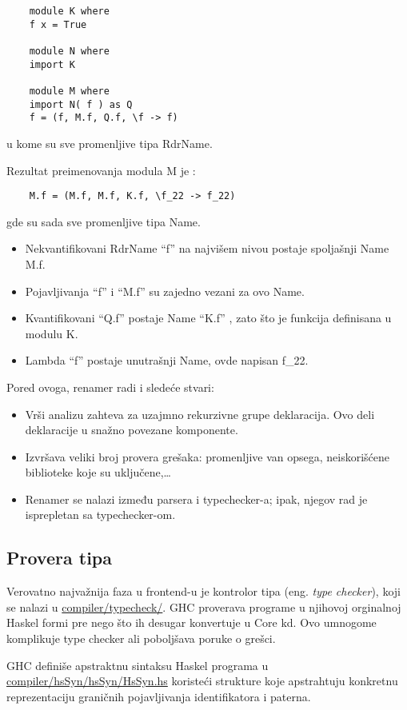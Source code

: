 \begin{verbatim}
	module K where
	f x = True
	
	module N where
	import K
	
	module M where
	import N( f ) as Q
	f = (f, M.f, Q.f, \f -> f)
\end{verbatim}
u kome su sve promenljive tipa RdrName. 

Rezultat preimenovanja modula M je :
\begin{verbatim}
	M.f = (M.f, M.f, K.f, \f_22 -> f_22)
\end{verbatim} 
gde su sada sve promenljive tipa Name.
\begin{itemize}
	\item Nekvantifikovani RdrName “f” na najvišem nivou postaje spoljašnji Name M.f.
	\item Pojavljivanja “f” i  “M.f” su zajedno vezani za ovo Name.
	\item Kvantifikovani “Q.f” postaje Name “K.f” , zato što je funkcija definisana u modulu K.
	\item Lambda “f” postaje unutrašnji Name, ovde napisan f\_22.
\end{itemize}

Pored ovoga, renamer radi i sledeće stvari:
\begin{itemize}
	\item Vrši analizu zahteva za uzajmno rekurzivne grupe deklaracija. Ovo deli deklaracije u snažno povezane komponente.
	\item Izvršava veliki broj provera grešaka: promenljive van opsega, neiskorišćene biblioteke koje su uključene,\ldots
	\item Renamer se nalazi između parsera i typechecker-a; ipak, njegov rad je isprepletan sa typechecker-om.
\end{itemize}

\subsection{Provera tipa}
\label{subsec:podnaslovTypecheck}

Verovatno najvažnija faza u frontend-u je kontrolor tipa (eng. \emph{type checker}), koji se nalazi u \underline{compiler/typecheck/}. GHC proverava programe u njihovoj orginalnoj Haskel formi pre nego što ih desugar konvertuje u Core kd. Ovo umnogome komplikuje type checker ali poboljšava poruke o grešci.

GHC definiše apstraktnu sintaksu Haskel programa u \\ \underline{compiler/hsSyn/hsSyn/HsSyn.hs}  koristeći strukture koje apstrahtuju konkretnu reprezentaciju graničnih pojavljivanja identifikatora i paterna.

